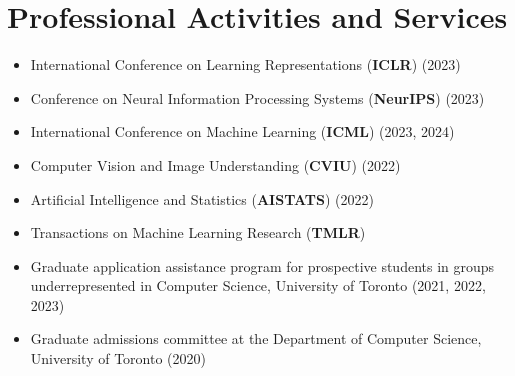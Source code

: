 \section*{Professional Activities and Services}
\vspace{\postsubhead}
\begin{adjustwidth}{\indentleft}{\indentright}
  \begin{itemize}
    \item International Conference on Learning Representations (\textbf{ICLR}) (2023)
    \item Conference on Neural Information Processing Systems  (\textbf{NeurIPS}) (2023)
    \item International Conference on Machine Learning (\textbf{ICML}) (2023, 2024)
    \item Computer Vision and Image Understanding (\textbf{CVIU}) (2022)
    \item Artificial Intelligence and Statistics (\textbf{AISTATS}) (2022)
    \item Transactions on Machine Learning Research (\textbf{TMLR}) 
    \item Graduate application assistance program for prospective students in groups underrepresented in Computer Science, University of Toronto (2021, 2022, 2023)
    \item Graduate admissions committee at the Department of Computer Science, University of Toronto (2020)
    
  \end{itemize}
\end{adjustwidth}

